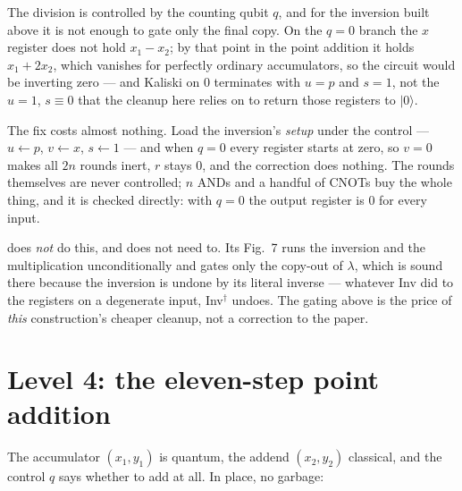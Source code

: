 \documentclass[11pt]{article}
\renewcommand{\ket}[1]{\lvert #1 \rangle}
\theoremstyle{plain}
\theoremstyle{remark}
\begin{document}
\begin{warnbox}[title={A control that has to reach all the way down --- here, though not everywhere}]
The division is controlled by the counting qubit $q$, and for the inversion built above it is not
enough to gate only the final copy. On the $q=0$ branch the $x$ register does not hold $x_1-x_2$;
by that point in the point addition it holds $x_1+2x_2$, which vanishes for perfectly ordinary
accumulators, so the circuit would be inverting zero --- and Kaliski on $0$ terminates with $u=p$
and $s=1$, not the $u=1$, $s\equiv0$ that the cleanup here relies on to return those registers to
$\ket0$.

The fix costs almost nothing. Load the inversion's \emph{setup} under the control ---
$u\leftarrow p$, $v\leftarrow x$, $s\leftarrow1$ --- and when $q=0$ every register starts at zero,
so $v=0$ makes all $2n$ rounds inert, $r$ stays $0$, and the correction does nothing. The rounds
themselves are never controlled; $n$ ANDs and a handful of CNOTs buy the whole thing, and it is
checked directly: with $q=0$ the output register is $0$ for every input.

\cite{ec:kim26} does \emph{not} do this, and does not need to. Its Fig.~7 runs the inversion and
the multiplication unconditionally and gates only the copy-out of $\lambda$, which is sound there
because the inversion is undone by its literal inverse --- whatever Inv did to the registers on a
degenerate input, Inv$^\dagger$ undoes. The gating above is the price of \emph{this} construction's
cheaper cleanup, not a correction to the paper.
\end{warnbox}

\section{Level 4: the eleven-step point addition}\label{ec:sec:padd}

The accumulator $(x_1,y_1)$ is quantum, the addend $(x_2,y_2)$ classical, and the control $q$ says
whether to add at all. In place, no garbage:
\end{document}

